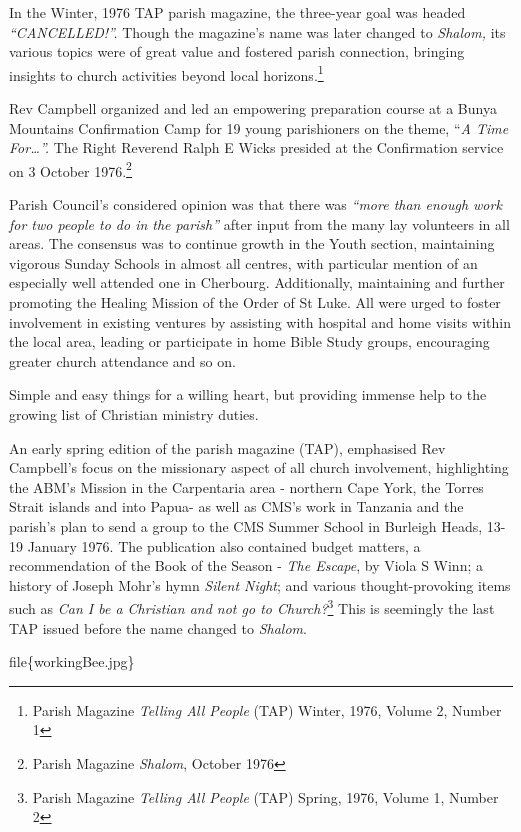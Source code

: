 In the Winter, 1976 TAP parish magazine, the three-year goal was headed \emph{``CANCELLED!''.} Though the magazine's name was later changed to \emph{Shalom,} its various topics were of great value and fostered parish connection, bringing insights to church activities beyond local horizons.\footnote{Parish Magazine \emph{Telling All People} (TAP) Winter, 1976, Volume 2, Number 1}

Rev Campbell organized and led an empowering preparation course at a Bunya Mountains Confirmation Camp for 19 young parishioners on the theme, ``\emph{A Time For\ldots''.} The Right Reverend Ralph E Wicks presided at the Confirmation service on 3 October 1976.\footnote{Parish Magazine \emph{Shalom}, October 1976}

Parish Council's considered opinion was that there was \emph{``more than enough work for two people to do in the parish''} after input from the many lay volunteers in all areas. The consensus was to continue growth in the Youth section, maintaining vigorous Sunday Schools in almost all centres, with particular mention of an especially well attended one in Cherbourg. Additionally, maintaining and further promoting the Healing Mission of the Order of St Luke. All were urged to foster involvement in existing ventures by assisting with hospital and home visits within the local area, leading or participate in home Bible Study groups, encouraging greater church attendance and so on.

Simple and easy things for a willing heart, but providing immense help to the growing list of Christian ministry duties.

An early spring edition of the parish magazine (TAP), emphasised Rev Campbell's focus on the missionary aspect of all church involvement, highlighting the ABM's Mission in the Carpentaria area - northern Cape York, the Torres Strait islands and into Papua- as well as CMS's work in Tanzania and the parish's plan to send a group to the CMS Summer School in Burleigh Heads, 13-19 January 1976. The publication also contained budget matters, a recommendation of the Book of the Season - \emph{The Escape}, by Viola S Winn; a history of Joseph Mohr's hymn \emph{Silent Night}; and various thought-provoking items such as \emph{Can I be a Christian and not go to Church?}\footnote{Parish Magazine \emph{Telling All People} (TAP) Spring, 1976, Volume 1, Number 2} This is seemingly the last TAP issued before the name changed to \emph{Shalom}.

file\{workingBee.jpg\}

